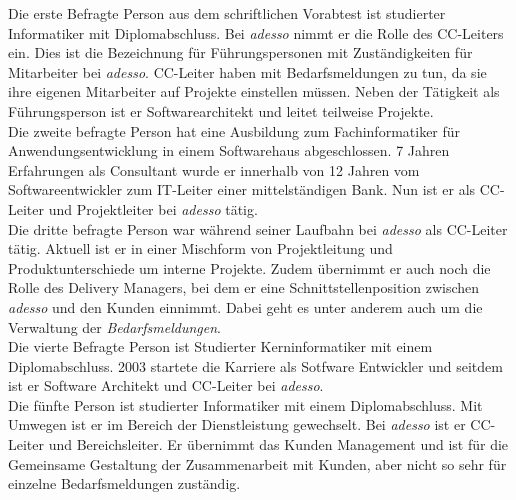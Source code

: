 Die erste Befragte Person aus dem schriftlichen Vorabtest ist studierter Informatiker mit Diplomabschluss. Bei \emph{adesso} nimmt er die Rolle des CC-Leiters ein. Dies ist die Bezeichnung für Führungspersonen mit Zuständigkeiten für Mitarbeiter bei \emph{adesso}. CC-Leiter haben mit Bedarfsmeldungen zu tun, da sie ihre eigenen Mitarbeiter auf Projekte einstellen müssen. Neben der Tätigkeit als Führungsperson ist er Softwarearchitekt und leitet teilweise Projekte.\\

Die zweite befragte Person hat eine Ausbildung zum Fachinformatiker für Anwendungsentwicklung in einem Softwarehaus abgeschlossen. 7 Jahren Erfahrungen als Consultant wurde er innerhalb von 12 Jahren vom Softwareentwickler zum IT-Leiter einer mittelständigen Bank. Nun ist er als CC-Leiter und Projektleiter bei \emph{adesso} tätig.\\

Die dritte befragte Person war während seiner Laufbahn bei \emph{adesso} als CC-Leiter tätig. Aktuell ist er in einer Mischform von Projektleitung und Produktunterschiede um interne Projekte. Zudem übernimmt er auch noch die Rolle des Delivery Managers, bei dem er eine Schnittstellenposition zwischen \emph{adesso} und den Kunden einnimmt. Dabei geht es unter anderem auch um die Verwaltung der \emph{Bedarfsmeldungen}.\\

Die vierte Befragte Person ist Studierter Kerninformatiker mit einem Diplomabschluss. 2003 startete die Karriere als Sotfware Entwickler und seitdem ist er Software Architekt und CC-Leiter bei \emph{adesso}.\\

Die fünfte Person ist studierter Informatiker mit einem Diplomabschluss. Mit Umwegen ist er im Bereich der Dienstleistung gewechselt. Bei \emph{adesso} ist er CC-Leiter und Bereichsleiter. Er übernimmt das Kunden Management und ist für die Gemeinsame Gestaltung der Zusammenarbeit mit Kunden, aber nicht so sehr für einzelne Bedarfsmeldungen zuständig.\\






